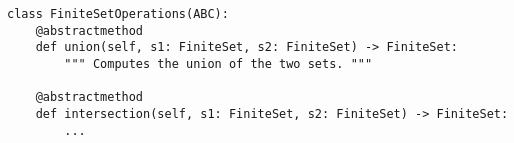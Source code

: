 \par\begin{minipage}{70ex}
\begin{verbatim}
class FiniteSetOperations(ABC):
    @abstractmethod
    def union(self, s1: FiniteSet, s2: FiniteSet) -> FiniteSet:
        """ Computes the union of the two sets. """

    @abstractmethod
    def intersection(self, s1: FiniteSet, s2: FiniteSet) -> FiniteSet:
        ...
\end{verbatim}
\end{minipage}\par